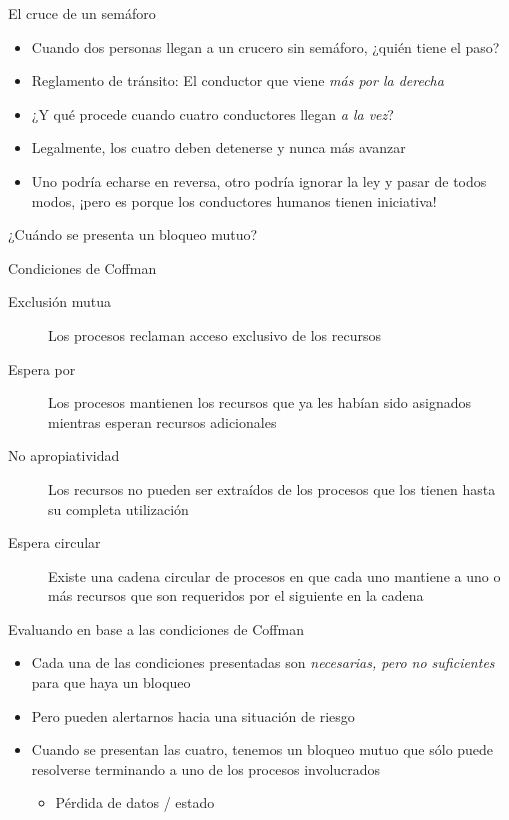 \documentclass[presentation]{beamer}
\begin{document}
\begin{frame}[label={sec:org2751da2}]{El cruce de un semáforo}
\begin{itemize}
\item Cuando dos personas llegan a un crucero sin semáforo, ¿quién tiene
el paso?
\end{itemize}
\pause
\begin{itemize}
\item Reglamento de tránsito: El conductor que viene \emph{más por la
derecha}
\end{itemize}
\begin{itemize}
\item ¿Y qué procede cuando cuatro conductores llegan \emph{a la vez}?
\end{itemize}
\pause
\begin{itemize}
\item Legalmente, los cuatro deben detenerse y nunca más avanzar
\item Uno podría echarse en reversa, otro podría ignorar la ley y pasar
de todos modos, ¡pero es porque los conductores humanos tienen iniciativa!
\end{itemize}
\end{frame}

\begin{frame}[label={sec:orge707701}]{¿Cuándo se presenta un bloqueo mutuo?}
\begin{center}
Condiciones de Coffman
\end{center}
\begin{description}
\item[{Exclusión mutua}] Los procesos reclaman acceso exclusivo de los
recursos
\item[{Espera por}] Los procesos mantienen los recursos que ya les habían
sido asignados mientras esperan recursos adicionales
\item[{No apropiatividad}] Los recursos no pueden ser extraídos de los
procesos que los tienen hasta su completa utilización
\item[{Espera circular}] Existe una cadena circular de procesos en que
cada uno mantiene a uno o más recursos que son requeridos por el
siguiente en la cadena
\end{description}
\end{frame}

\begin{frame}[label={sec:org4d8b088}]{Evaluando en base a las condiciones de Coffman}
\begin{itemize}
\item Cada una de las condiciones presentadas son \emph{necesarias, pero no
suficientes} para que haya un bloqueo
\item Pero pueden alertarnos hacia una situación de riesgo
\item Cuando se presentan las cuatro, tenemos un bloqueo mutuo que sólo
puede resolverse terminando a uno de los procesos involucrados
\begin{itemize}
\item Pérdida de datos / estado
\end{itemize}
\end{itemize}
\end{frame}
\end{document}
